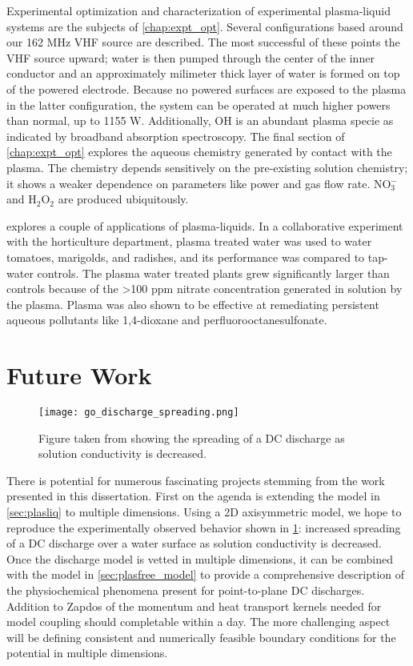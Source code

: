 Experimental optimization and characterization of experimental plasma-liquid systems are the subjects of \cref{chap:expt_opt}. Several configurations based around our 162 MHz VHF source are described. The most successful of these points the VHF source upward; water is then pumped through the center of the inner conductor and an approximately milimeter thick layer of water is formed on top of the powered electrode. Because no powered surfaces are exposed to the plasma in the latter configuration, the system can be operated at much higher powers than normal, up to 1155 W. Additionally, OH is an abundant plasma specie as indicated by broadband absorption spectroscopy. The final section of \cref{chap:expt_opt} explores the aqueous chemistry generated by contact with the plasma. The chemistry depends sensitively on the pre-existing solution chemistry; it shows a weaker dependence on parameters like power and gas flow rate. NO$_3^-$ and H$_2$O$_2$ are produced ubiquitously.

 explores a couple of applications of plasma-liquids. In a collaborative experiment with the horticulture department, plasma treated water was used to water tomatoes, marigolds, and radishes, and its performance was compared to tap-water controls. The plasma water treated plants grew significantly larger than controls because of the >100 ppm nitrate concentration generated in solution by the plasma. Plasma was also shown to be effective at remediating persistent aqueous pollutants like 1,4-dioxane and perfluorooctanesulfonate.

\section{Future Work}

\begin{figure}[htbp]
  \centering
  \texttt{[image: go\_discharge\_spreading.png]}
  \caption{Figure taken from \cite{rumbach2015solvation} showing the spreading of a DC discharge as solution conductivity is decreased.}
  \label{fig:go_spreading}
\end{figure}

There is potential for numerous fascinating projects stemming from the work presented in this dissertation. First on the agenda is extending the model in \cref{sec:plasliq} to multiple dimensions. Using a 2D axisymmetric model, we hope to reproduce the experimentally observed behavior shown in \cref{fig:go_spreading}: increased spreading of a DC discharge over a water surface as solution conductivity is decreased. Once the discharge model is vetted in multiple dimensions, it can be combined with the model in \cref{sec:plasfree_model} to provide a comprehensive description of the physiochemical phenomena present for point-to-plane DC discharges. Addition to Zapdos of the momentum and heat transport kernels needed for model coupling should completable within a day. The more challenging aspect will be defining consistent and numerically feasible boundary conditions for the potential in multiple dimensions.


